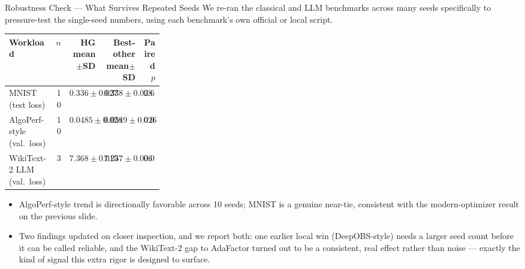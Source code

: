 \documentclass[aspectratio=169,11pt]{beamer}
\begin{document}
\begin{frame}{Robustness Check --- What Survives Repeated Seeds}
  \small
  We re-ran the classical and LLM benchmarks across many seeds specifically to pressure-test the
  single-seed numbers, using each benchmark's own official or local script.
  \vspace{0.3em}

  \scriptsize
  \begin{tabular}{@{}p{0.30\linewidth}rrrr@{}}
    \toprule
    Workload & $n$ & HG mean$\pm$SD & Best-other mean$\pm$SD & Paired $p$ \\
    \midrule
    MNIST (test loss) & 10 & $0.336\pm0.027$ & $0.338\pm0.028$ & $0.688$ \\
    AlgoPerf-style (val.\ loss) & 10 & $0.0485\pm0.028$ & $0.0549\pm0.026$ & $0.067$ \\
    WikiText-2 LLM (val.\ loss) & 3 & $7.368\pm0.015$ & $7.237\pm0.006$ & $0.003$ \\
    \bottomrule
  \end{tabular}
  \vspace{0.5em}
  \begin{itemize}
    \item AlgoPerf-style trend is directionally favorable across 10 seeds; MNIST is a genuine
      near-tie, consistent with the modern-optimizer result on the previous slide.
    \item Two findings updated on closer inspection, and we report both: one earlier local win
      (DeepOBS-style) needs a larger seed count before it can be called reliable, and the
      WikiText-2 gap to AdaFactor turned out to be a consistent, real effect rather than noise ---
      exactly the kind of signal this extra rigor is designed to surface.
  \end{itemize}
\end{frame}
\end{document}
